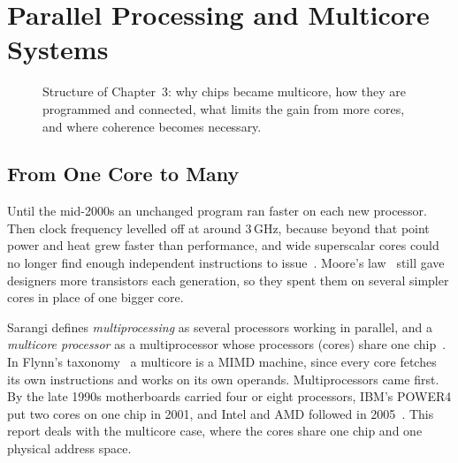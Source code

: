 \chapter{Parallel Processing and Multicore Systems}
\label{ch:parallel}

\begin{figure}[htbp]
\centering
{}
\caption[]{Structure of Chapter~3: why chips became
multicore, how they are programmed and connected, what limits the gain from more
cores, and where coherence becomes necessary.}
\label{fig:ch3-map}
\end{figure}

\section{From One Core to Many}
\label{sec:par-why}
\label{sec:par-defs}
\label{sec:par-flynn}
%

Until the mid-2000s an unchanged program ran faster on each new processor. Then
clock frequency levelled off at around 3\,GHz, because beyond that point power and
heat grew faster than performance, and wide superscalar cores could no longer find
enough independent instructions to issue~\cite[\S12.1]{sarangi2025basic}. Moore's
law~\cite{moore1965cramming} still gave designers more transistors each
generation, so they spent them on several simpler cores in place of one bigger
core.

Sarangi defines \emph{multiprocessing} as several processors working in parallel,
and a \emph{multicore processor} as a multiprocessor
whose processors (cores) share one chip~\cite[\S12.1, Def.~116]{sarangi2025basic}.
In Flynn's taxonomy~\cite{flynn1972organizations}\cite[\S12.3]{sarangi2025basic} a
multicore is a MIMD machine, since every core fetches its own instructions and
works on its own operands. Multiprocessors came first. By the late 1990s
motherboards carried four or eight processors, IBM's POWER4 put two cores on one
chip in 2001, and Intel and AMD followed in 2005~\cite[\S12.1]{sarangi2025basic}.
This report deals with the multicore case, where the cores share one chip and one
physical address space.

